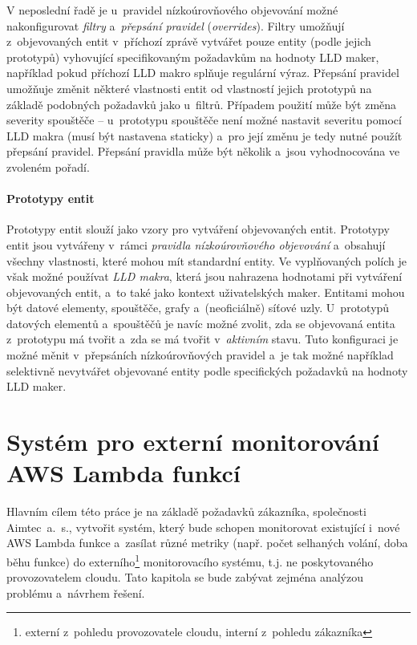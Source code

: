 \documentclass[czech, ing, kiv, he, iso690]{fasthesis}
\begin{document}
V neposlední řadě je u~pravidel nízkoúrovňového objevování možné nakonfigurovat \emph{filtry} a~\emph{přepsání pravidel} (\emph{overrides}). Filtry umožňují z~objevovaných entit v~příchozí zprávě vytvářet pouze entity (podle jejich prototypů) vyhovující specifikovaným požadavkům na hodnoty LLD maker, například pokud příchozí LLD makro splňuje regulární výraz. Přepsání pravidel umožňuje změnit některé vlastnosti entit od vlastností jejich prototypů na základě podobných požadavků jako u~filtrů. Případem použití může být změna severity spouštěče -- u~prototypu spouštěče není možné nastavit severitu pomocí LLD makra (musí být nastavena staticky) a~pro její změnu je tedy nutné použít přepsání pravidel. Přepsání pravidla může být několik a~jsou vyhodnocována ve zvoleném pořadí. 

\subsubsection{Prototypy entit}
Prototypy entit slouží jako vzory pro vytváření objevovaných entit. Prototypy entit jsou vytvářeny v~rámci \emph{pravidla nízkoúrovňového objevování} a~obsahují všechny vlastnosti, které mohou mít standardní entity. Ve vyplňovaných polích je však možné používat \emph{LLD makra}, která jsou nahrazena hodnotami při vytváření objevovaných entit, a~to také jako kontext uživatelských maker. Entitami mohou být datové elementy, spouštěče, grafy a~(neoficiálně) síťové uzly. U~prototypů datových elementů a~spouštěčů je navíc možné zvolit, zda se objevovaná entita z~prototypu má tvořit a~zda se má tvořit v~\emph{aktivním} stavu. Tuto konfiguraci je možné měnit v~přepsáních nízkoúrovňových pravidel a~je tak možné například selektivně nevytvářet objevované entity podle specifických požadavků na hodnoty LLD maker.

\chapter{Systém pro externí monitorování AWS Lambda funkcí}
Hlavním cílem této práce je na základě požadavků zákazníka, společnosti Aimtec~a.~s., vytvořit systém, který bude schopen monitorovat existující i~nové AWS Lambda funkce a~zasílat různé metriky (např. počet selhaných volání, doba běhu funkce) do externího\footnote{externí z~pohledu provozovatele cloudu, interní z~pohledu zákazníka} monitorovacího systému, t.j. ne poskytovaného provozovatelem cloudu. Tato kapitola se bude zabývat zejména analýzou problému a~návrhem řešení.
\end{document}
